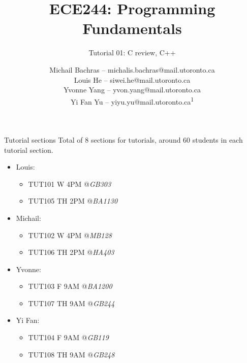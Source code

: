 \documentclass{beamer}
\title{ECE244: Programming Fundamentals}
\subtitle{Tutorial 01: C review, C++}
\author{
    Michail Bachras -- michalis.bachras@mail.utoronto.ca \\
    Louis He -- siwei.he@mail.utoronto.ca \\
    Yvonne Yang -- yvon.yang@mail.utoronto.ca \\
    Yi Fan Yu -- yiyu.yu@mail.utoronto.ca\textsuperscript{1}
}
\date{}
\begin{document}
\begin{frame}[plain]
    \titlepage

\end{frame}
\begin{frame}{Tutorial sections}
    Total of 8 sections for tutorials, around 60 students in each tutorial section.
    \begin{itemize}
        \item Louis:
        \begin{itemize}
            \item TUT101 W 4PM @\textit{GB303}
            \item TUT105 TH 2PM @\textit{BA1130}
        \end{itemize}
        \item Michail:
        \begin{itemize}
            \item TUT102 W 4PM @\textit{MB128}
            \item TUT106 TH 2PM @\textit{HA403} 
        \end{itemize}
        \item Yvonne:
        \begin{itemize}
            \item TUT103 F 9AM @\textit{BA1200}
            \item TUT107 TH 9AM @\textit{GB244} 
        \end{itemize}
        \item Yi Fan:
        \begin{itemize}
            \item TUT104 F 9AM @\textit{GB119}
            \item TUT108 TH 9AM @\textit{GB248} 
        \end{itemize}
    \end{itemize}
\end{frame}
    


\end{document}
